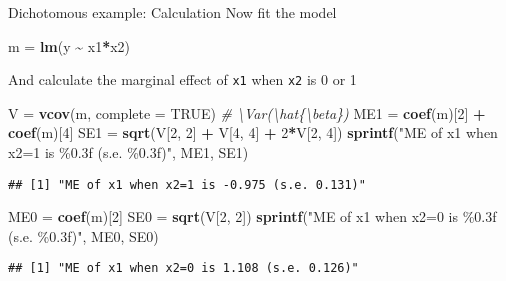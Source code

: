 \documentclass[
  ignorenonframetext,
]{beamer}
\newenvironment{Shaded}{\begin{snugshade}}{\end{snugshade}}
\newcommand{\AttributeTok}[1]{\textcolor[rgb]{0.13,0.29,0.53}{#1}}
\newcommand{\CommentTok}[1]{\textcolor[rgb]{0.56,0.35,0.01}{\textit{#1}}}
\newcommand{\ConstantTok}[1]{\textcolor[rgb]{0.56,0.35,0.01}{#1}}
\newcommand{\DecValTok}[1]{\textcolor[rgb]{0.00,0.00,0.81}{#1}}
\newcommand{\FunctionTok}[1]{\textcolor[rgb]{0.13,0.29,0.53}{\textbf{#1}}}
\newcommand{\NormalTok}[1]{#1}
\newcommand{\OtherTok}[1]{\textcolor[rgb]{0.56,0.35,0.01}{#1}}
\newcommand{\SpecialCharTok}[1]{\textcolor[rgb]{0.81,0.36,0.00}{\textbf{#1}}}
\newcommand{\StringTok}[1]{\textcolor[rgb]{0.31,0.60,0.02}{#1}}
\begin{document}
\begin{frame}[fragile]{Dichotomous example: Calculation}
\protect\hypertarget{dichotomous-example-calculation}{}
Now fit the model

\begin{Shaded}
\begin{Highlighting}[]
\NormalTok{m }\OtherTok{=} \FunctionTok{lm}\NormalTok{(y }\SpecialCharTok{\textasciitilde{}}\NormalTok{ x1}\SpecialCharTok{*}\NormalTok{x2)}
\end{Highlighting}
\end{Shaded}

\pause

And calculate the marginal effect of \texttt{x1} when \texttt{x2} is 0 or 1

\begin{Shaded}
\begin{Highlighting}[]
\NormalTok{V }\OtherTok{=} \FunctionTok{vcov}\NormalTok{(m, }\AttributeTok{complete =} \ConstantTok{TRUE}\NormalTok{) }\CommentTok{\# \textbackslash{}Var(\textbackslash{}hat\{\textbackslash{}beta\})}
\NormalTok{ME1 }\OtherTok{=} \FunctionTok{coef}\NormalTok{(m)[}\DecValTok{2}\NormalTok{] }\SpecialCharTok{+} \FunctionTok{coef}\NormalTok{(m)[}\DecValTok{4}\NormalTok{]}
\NormalTok{SE1 }\OtherTok{=} \FunctionTok{sqrt}\NormalTok{(V[}\DecValTok{2}\NormalTok{, }\DecValTok{2}\NormalTok{] }\SpecialCharTok{+}\NormalTok{ V[}\DecValTok{4}\NormalTok{, }\DecValTok{4}\NormalTok{] }\SpecialCharTok{+} \DecValTok{2}\SpecialCharTok{*}\NormalTok{V[}\DecValTok{2}\NormalTok{, }\DecValTok{4}\NormalTok{])}
\FunctionTok{sprintf}\NormalTok{(}\StringTok{"ME of x1 when x2=1 is \%0.3f (s.e. \%0.3f)"}\NormalTok{, ME1, SE1)}
\end{Highlighting}
\end{Shaded}

\begin{verbatim}
## [1] "ME of x1 when x2=1 is -0.975 (s.e. 0.131)"
\end{verbatim}

\begin{Shaded}
\begin{Highlighting}[]
\NormalTok{ME0 }\OtherTok{=} \FunctionTok{coef}\NormalTok{(m)[}\DecValTok{2}\NormalTok{]}
\NormalTok{SE0 }\OtherTok{=} \FunctionTok{sqrt}\NormalTok{(V[}\DecValTok{2}\NormalTok{, }\DecValTok{2}\NormalTok{])}
\FunctionTok{sprintf}\NormalTok{(}\StringTok{"ME of x1 when x2=0 is \%0.3f (s.e. \%0.3f)"}\NormalTok{, ME0, SE0)}
\end{Highlighting}
\end{Shaded}

\begin{verbatim}
## [1] "ME of x1 when x2=0 is 1.108 (s.e. 0.126)"
\end{verbatim}
\end{frame}
\end{document}
